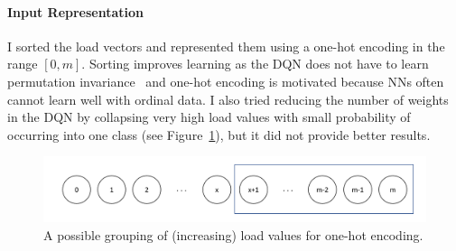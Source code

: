 \paragraph{Input Representation} I sorted the load vectors and represented them using a one-hot encoding in the range $[0, m]$. Sorting improves learning as the DQN does not have to learn permutation invariance~\cite{zaheer2017permutationinvariance} and one-hot encoding is motivated because NNs often cannot learn well with ordinal data. I also tried reducing the number of weights in the DQN by collapsing very high load values with small probability of occurring into one class (see Figure~\ref{NN-maxload}), but it did not provide better results.


\begin{figure}[h]
    \centering
    \includegraphics[scale=0.5]{Chapter3/Figs/NN_maxload.pdf}
    \caption{A possible grouping of (increasing) load values for one-hot encoding.}
    \label{NN-maxload}
\end{figure}

